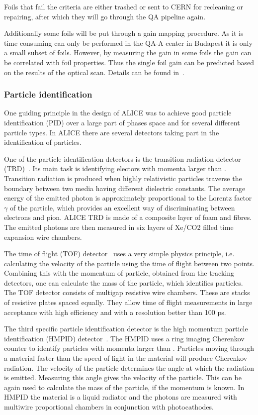 Foils that fail the criteria are either trashed or sent to CERN for recleaning or repairing, after which they will go through the QA pipeline again.

Additionally some foils will be put through a gain mapping procedure. As it is time consuming can only be performed in the QA-A center in Budapest it is only a small subset of foils. However, by measuring the gain in some foils the gain can be correlated with foil properties. Thus the single foil gain can be predicted based on the results of the optical scan. Details can be found in~\cite{MartonThesis}.


\subsubsection{Particle identification}
One guiding principle in the design of ALICE was to achieve good particle identification (PID) over  a large part of phases space and for several different particle types. In ALICE there are several detectors taking part in the identification of particles. 

One of the particle identification detectors is the transition radiation detector (TRD)~\cite{Cortese:519145}. Its main task is identifying electors with momenta larger than \unit[1]{\gev}. Transition radiation is produced when highly relativistic particles traverse the boundary between two media having different dielectric constants. The average energy of the emitted photon is approximately proportional to the Lorentz factor $\gamma$ of the particle, which provides an excellent way of discriminating between electrons and pion. ALICE TRD is made of a composite layer of foam and fibres. The emitted photons are then measured in six layers of Xe/CO2 filled time expansion wire chambers. 

The time of flight  (TOF) detector~\cite{Dellacasa:2000kh} uses a very simple physics principle, i.e. calculating the velocity of the particle using the time of flight between two points. Combining this with the momentum of particle, obtained from the tracking detectors, one can calculate the mass of the particle, which identifies particles. The TOF detector consists of multigap resistive wire chambers. These are stacks of resistive plates spaced equally. They allow time of flight measurements in large acceptance with high efficiency and with a resolution better than 100 ps. 

The third specific particle identification detector is the high momentum particle identification (HMPID) detector~\cite{Beole:1998yq}. The HMPID uses a ring imaging Cherenkov counter to identify particles with momenta larger than \unit[1]{\gev}. Particles moving through a material faster than the speed of light in the material will produce Cherenkov radiation. The velocity of the particle determines the angle at which the radiation is emitted. Measuring this angle gives the velocity of the particle. This can be again used to calculate the mass of the particle, if the momentum is known. In HMPID the material is a liquid radiator and the photons are measured with multiwire proportional chambers in conjunction with photocathodes. 


